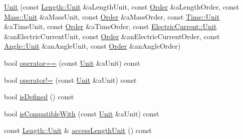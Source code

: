\begin{DoxyCompactItemize}
\item 
\hyperlink{classostk_1_1physics_1_1units_1_1_derived_1_1_unit_a2f40f9bd4c0d94f13c5a4cd4e6d7a91c}{Unit} (const \hyperlink{classostk_1_1physics_1_1units_1_1_length_a2664470a7eedf5d45c88861fe69badea}{Length\+::\+Unit} \&a\+Length\+Unit, const \hyperlink{classostk_1_1physics_1_1units_1_1_derived_1_1_order}{Order} \&a\+Length\+Order, const \hyperlink{classostk_1_1physics_1_1units_1_1_mass_aa8994892478fdbe6dc78d4bca08db0fa}{Mass\+::\+Unit} \&a\+Mass\+Unit, const \hyperlink{classostk_1_1physics_1_1units_1_1_derived_1_1_order}{Order} \&a\+Mass\+Order, const \hyperlink{classostk_1_1physics_1_1units_1_1_time_aa961f0dbca7ec297e19e15e0dfa3bb4a}{Time\+::\+Unit} \&a\+Time\+Unit, const \hyperlink{classostk_1_1physics_1_1units_1_1_derived_1_1_order}{Order} \&a\+Time\+Order, const \hyperlink{classostk_1_1physics_1_1units_1_1_electric_current_ac57c87a7533dc73b87185b0d9ae6985b}{Electric\+Current\+::\+Unit} \&an\+Electric\+Current\+Unit, const \hyperlink{classostk_1_1physics_1_1units_1_1_derived_1_1_order}{Order} \&an\+Electric\+Current\+Order, const \hyperlink{classostk_1_1physics_1_1units_1_1_angle_aea1f8018b1d378b9dee56959d8eb9def}{Angle\+::\+Unit} \&an\+Angle\+Unit, const \hyperlink{classostk_1_1physics_1_1units_1_1_derived_1_1_order}{Order} \&an\+Angle\+Order)
\item 
bool \hyperlink{classostk_1_1physics_1_1units_1_1_derived_1_1_unit_af585bf9564ac42ca3d82bb2a58fe4465}{operator==} (const \hyperlink{classostk_1_1physics_1_1units_1_1_derived_1_1_unit}{Unit} \&a\+Unit) const
\item 
bool \hyperlink{classostk_1_1physics_1_1units_1_1_derived_1_1_unit_a488e9bfa1834dbf6a7807fc9d3d00271}{operator!=} (const \hyperlink{classostk_1_1physics_1_1units_1_1_derived_1_1_unit}{Unit} \&a\+Unit) const
\item 
bool \hyperlink{classostk_1_1physics_1_1units_1_1_derived_1_1_unit_a24e22ed8550220e0d4235a35374be0a4}{is\+Defined} () const
\item 
bool \hyperlink{classostk_1_1physics_1_1units_1_1_derived_1_1_unit_abf13c177ca1d85634222b3410c0528b5}{is\+Compatible\+With} (const \hyperlink{classostk_1_1physics_1_1units_1_1_derived_1_1_unit}{Unit} \&a\+Unit) const
\item 
const \hyperlink{classostk_1_1physics_1_1units_1_1_length_a2664470a7eedf5d45c88861fe69badea}{Length\+::\+Unit} \& \hyperlink{classostk_1_1physics_1_1units_1_1_derived_1_1_unit_a925301080673e1eb527ea6dc1340b1bb}{access\+Length\+Unit} () const

\end{DoxyCompactItemize}
